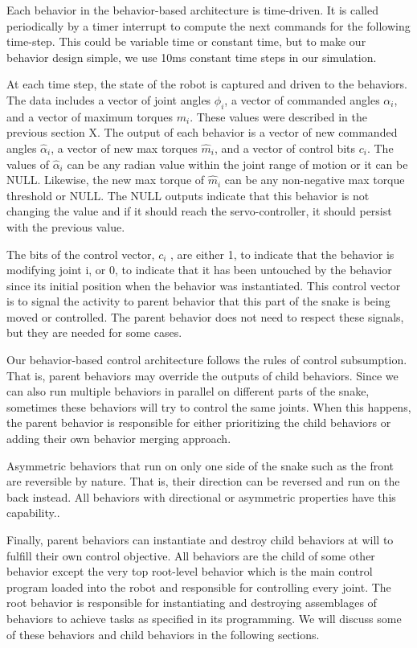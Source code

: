 Each behavior in the behavior-based architecture is time-driven. It is called periodically by a timer interrupt to compute the next commands for the following time-step. This could be variable time or constant time, but to make our behavior design simple, we use 10ms constant time steps in our simulation.

At each time step, the state of the robot is captured and driven to the behaviors. The data includes a vector of joint angles $\phi_i$, a vector of commanded angles $\alpha_i$, and a vector of maximum torques $m_i$. These values were described in the previous section X. The output of each behavior is a vector of new commanded angles $\hat{\alpha}_i$, a vector of new max torques $\hat{m}_i$, and a vector of control bits $c_i$. The values of $\hat{\alpha}_i$ can be any radian value within the joint range of motion or it can be NULL. Likewise, the new max torque of $\hat{m}_i$ can be any non-negative max torque threshold or NULL. The NULL outputs indicate that this behavior is not changing the value and if it should reach the servo-controller, it should persist with the previous value.

The bits of the control vector, $c_i$ , are either 1, to indicate that the behavior is modifying joint i, or 0, to indicate that it has been untouched by the behavior since its initial position when the behavior was instantiated. This control vector is to signal the activity to parent behavior that this part of the snake is being moved or controlled. The parent behavior does not need to respect these signals, but they are needed for some cases.

Our behavior-based control architecture follows the rules of control subsumption. That is, parent behaviors may override the outputs of child behaviors. Since we can also run multiple behaviors in parallel on different parts of the snake, sometimes these behaviors will try to control the same joints. When this happens, the parent behavior is responsible for either prioritizing the child behaviors or adding their own behavior merging approach.

Asymmetric behaviors that run on only one side of the snake such as the front are reversible by nature. That is, their direction can be reversed and run on the back instead. All behaviors with directional or asymmetric properties have this capability..

Finally, parent behaviors can instantiate and destroy child behaviors at will to fulfill their own control objective. All behaviors are the child of some other behavior except the very top root-level behavior which is the main control program loaded into the robot and responsible for controlling every joint. The root behavior is responsible for instantiating and destroying assemblages of behaviors to achieve tasks as specified in its programming. We will discuss some of these behaviors and child behaviors in the following sections.

